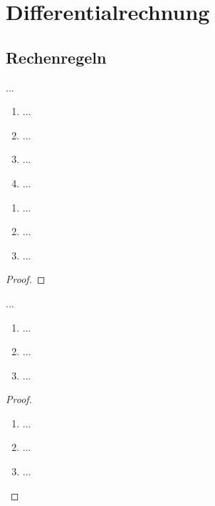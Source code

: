 \documentclass[12pt]{scrreprt}
\begin{document}
\begin{dfn}\label{}

\end{dfn}

\begin{bsp}\label{}

\end{bsp}

\chapter{Differentialrechnung}
\label{cha:diff}

\section{Rechenregeln}
\label{}

\begin{dfn}\label{}

\end{dfn}

\begin{bem*}
...
\begin{enumerate}
\item ...
\item ...
\item ...
\item ...
\end{enumerate}
\end{bem*}

\begin{bsp}\label{}
\begin{enumerate}
\item ...
\item ...
\item ...
\end{enumerate}
\end{bsp}

\begin{satz}\label{}

\end{satz}
\begin{proof}

\end{proof}

\begin{satz}\label{}
...
\begin{enumerate}
\item ...
\item ...
\item ...
\end{enumerate}
\end{satz}
\begin{proof}
\begin{enumerate}
\item ...
\item ...
\item ...
\end{enumerate}
\end{proof}
\end{document}
